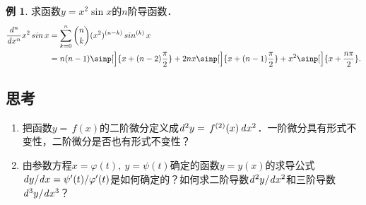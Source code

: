 \documentclass[a4paper,punct=CCT]{ctexbook}
\renewcommand*{\siand}{\shortintertext{和}}
\theoremstyle{definition}
\newtheorem*{example*}{例}
\theoremstyle{remark}
\newif\ifshowsolp
\begin{document}
\begin{example*}
  求函数\(y = x^2 \sin x\)的\(n\)阶导函数．
  \begin{equation*}
    \begin{split}
      \dd[^n]{x^n} x^2 \sin x
      &= \sum_{k=0}^n \binom nk (x^2)^{(n-k)} \sin^{(k)}x \\
      &= n(n-1) \sinp[\Big]{x+(n-2)\frac{\pi}{2}}
      + 2nx \sinp[\Big]{x+(n-1)\frac{\pi}{2}}
      + x^2 \sinp[\Big]{x+\frac{n\pi}{2}}.
    \end{split}
  \end{equation*}
\end{example*}

\subsection*{思考}

\begin{enumerate}
\item 把函数\(y = \,f(x)\)的二阶微分定义成\(\mathop{}\!\mathit{d}^2y = \,f^{(2)}(x) \mathop{}\!\mathit{d} x^2\)．一阶微分具有形式不变性，二阶微分是否也有形式不变性？

  \ifshowsolp
  没有．令\(y = \,f(u),\ u = g(x)\)，有
  \begin{gather*}
    \diff_u^2 y
    = f^{(2)}(u) \du^2
    = f^{(2)}\paren[\big]{g(x)} \paren[\big]{g'(x)}^2 \dx^2, \\
    \diff_x^2 y
    = \paren[\Big]{\,f^{(2)}\paren[\big]{g(x)} \paren[\big]{g'(x)}^2 + f'\paren[\big]{g(x)}\,g^{(2)}(x)} \dx^2.
  \end{gather*}
  \fi

\item 由参数方程\(x = \varphi(t),\ y = \psi(t)\)确定的函数\(y = y(x)\)的求导公式\(\mathop{}\!\mathit{d} y/\!\mathop{}\!\mathit{d} x = \psi'(t)/\varphi'(t)\)是如何确定的？如何求二阶导数\(\mathop{}\!\mathit{d}^2y/\!\mathop{}\!\mathit{d} x^2\)和三阶导数\(\mathop{}\!\mathit{d}^3y/\!\mathop{}\!\mathit{d} x^3\)？

  \ifshowsolp
  确定的方式多种多样，最简单的方式就是把\(t\)看成\(x\)的函数，然后根据定理~\ref{thm:derivcomp}和~\ref{thm:derivinv}就能得到．使用同样的方法，能得到
  \begin{gather*}
    \dd[^2y]{x^2}
    = \ddt \frac{\psi'}{\varphi'} \cdot \dd[t]x
    = \frac{\psi^{(2)}}{\paren{\varphi'}^2}
    - \frac{\psi'\varphi^{(2)}}{\paren{\varphi'}^3}, \\
    \siand
    \begin{split}
      \ddn[y]x3
      &= \ddt \paren[\Bigg]{\frac{\psi^{(2)}}{\paren{\varphi'}^2}
        - \frac{\psi'\varphi^{(2)}}{\paren{\varphi'}^3}} \cdot \dd[t]x \\
      &= \frac{\psi^{(3)}}{(\varphi')^3}
      - \frac{\psi^{(2)}\varphi^{(2)}
        + \psi'\varphi^{(3)}
        + 2\psi^{(2)}\varphi^{(2)}}{(\varphi')^4}
      + \frac{3\psi'(\varphi^{(2)})^2}{(\varphi')^5}.
    \end{split}
  \end{gather*}
  \fi
\end{enumerate}
\end{document}
